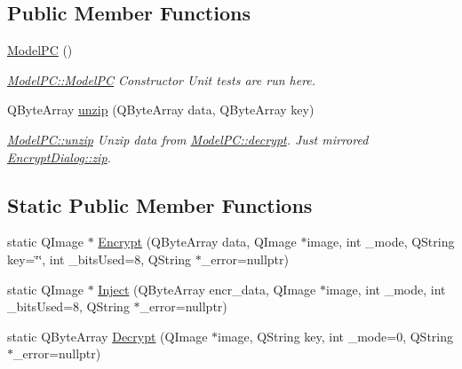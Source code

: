 \subsection*{Public Member Functions}
\begin{DoxyCompactItemize}
\item 
\hyperlink{class_model_p_c_ae12ebe65ec973c02a0de4850a7c1e31c}{Model\-P\-C} ()
\begin{DoxyCompactList}\small\item\em \hyperlink{class_model_p_c_ae12ebe65ec973c02a0de4850a7c1e31c}{Model\-P\-C\-::\-Model\-P\-C} Constructor Unit tests are run here. \end{DoxyCompactList}\item 
Q\-Byte\-Array \hyperlink{class_model_p_c_a6da88f166785a49f73b22c169f956fd0}{unzip} (Q\-Byte\-Array data, Q\-Byte\-Array key)
\begin{DoxyCompactList}\small\item\em \hyperlink{class_model_p_c_a6da88f166785a49f73b22c169f956fd0}{Model\-P\-C\-::unzip} Unzip data from \hyperlink{class_model_p_c_a5995215a34a1e1f504035715a8013809}{Model\-P\-C\-::decrypt}. Just mirrored \hyperlink{class_encrypt_dialog_a2bff820a3df4ddc36ecb07ed74b7138a}{Encrypt\-Dialog\-::zip}. \end{DoxyCompactList}\end{DoxyCompactItemize}
\subsection*{Static Public Member Functions}
\begin{DoxyCompactItemize}
\item 
static Q\-Image $\ast$ \hyperlink{class_model_p_c_a271cf9285e32df58ffbfc918e6482bbd}{Encrypt} (Q\-Byte\-Array data, Q\-Image $\ast$image, int \-\_\-mode, Q\-String key=\char`\"{}\char`\"{}, int \-\_\-bits\-Used=8, Q\-String $\ast$\-\_\-error=nullptr)
\item 
static Q\-Image $\ast$ \hyperlink{class_model_p_c_ac17e68e6aab134621b0d151d74acdc82}{Inject} (Q\-Byte\-Array encr\-\_\-data, Q\-Image $\ast$image, int \-\_\-mode, int \-\_\-bits\-Used=8, Q\-String $\ast$\-\_\-error=nullptr)
\item 
static Q\-Byte\-Array \hyperlink{class_model_p_c_a902abaea4f07995b48c0f2fea6eceb7c}{Decrypt} (Q\-Image $\ast$image, Q\-String key, int \-\_\-mode=0, Q\-String $\ast$\-\_\-error=nullptr)
\end{DoxyCompactItemize}
